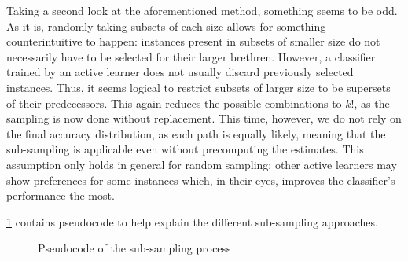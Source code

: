 Taking a second look at the aforementioned method, something seems to be odd. As it is, randomly taking subsets of each size allows for something counterintuitive to happen: instances present in subsets of smaller size do not necessarily have to be selected for their larger brethren. However, a classifier trained by an active learner does not usually discard previously selected instances. Thus, it seems logical to restrict subsets of larger size to be supersets of their predecessors. This again reduces the possible combinations to $k!$, as the sampling is now done without replacement. This time, however, we do not rely on the final accuracy distribution, as each path is equally likely, meaning that the sub-sampling is applicable even without precomputing the estimates. This assumption only holds in general for random sampling; other active learners may show preferences for some instances which, in their eyes, improves the classifier's performance the most.

\ref{alg:subSampling} contains pseudocode to help explain the different sub-sampling approaches.

\begin{figure}
	\begin{algorithmic}[1]
		\State {}
		\State {}
		\EndFor
		\EndFor
		\EndFor
		\EndFor
		\EndFor
		\EndFor
		
	\end{algorithmic}
	\caption{Pseudocode of the sub-sampling process}
	\label{alg:subSampling}
\end{figure}

